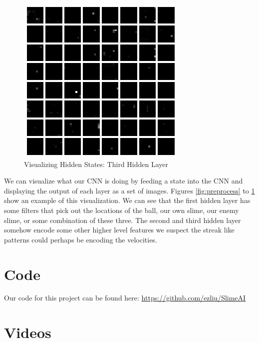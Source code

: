 \documentclass[10pt,twocolumn,letterpaper]{article}
\begin{document}
\begin{figure}[H]
\center
\includegraphics[width=\columnwidth]{layer3}
\caption{
Visualizing Hidden States: Third Hidden Layer
}\label{fig:layer3}
\end{figure}

We can visualize what our CNN is doing by feeding a state into the CNN and
displaying the output of each layer as a set of images. Figures \ref{fig:preprocess}
to \ref{fig:layer3} show an example of this visualization. We can see that
the first hidden layer has some filters that pick out the locations of the ball,
our own slime, our enemy slime, or some combination of these three. The second
and third hidden layer somehow encode some other higher level features we
suspect the streak like patterns could perhaps be encoding the velocities.

\section{Code}

Our code for this project can be found here:
\url{https://github.com/ezliu/SlimeAI}

\section{Videos}
\end{document}
